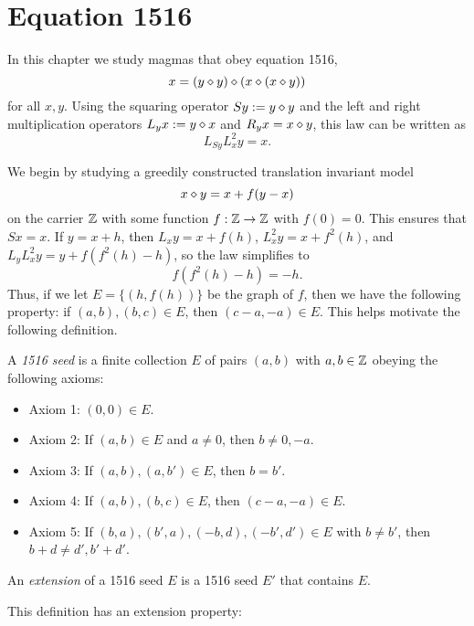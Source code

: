 \chapter{Equation 1516}\label{1516-chapter}

In this chapter we study magmas that obey equation 1516,
\begin{equation}\label{1516}
  x = (y \diamond y) \diamond (x \diamond (x \diamond y))
\end{equation}
for all $x,y$.  Using the squaring operator $Sy := y \diamond y$ and the left and right multiplication operators $L_y x := y \diamond x$ and $R_y x = x \diamond y$, this law can be written as
$$ L_{Sy} L_x^2 y = x.$$

We begin by studying a greedily constructed translation invariant model
\begin{equation}\label{xy-1516}
   x \diamond y = x+f(y-x)
\end{equation}
on the carrier $\mathbb{Z}$ with some function $f:\mathbb{Z} \to \mathbb{Z}$ with $f(0)=0$.  This ensures that $Sx = x$.  If $y = x+h$, then $L_x y = x + f(h)$, $L_x^2 y = x + f^2(h)$, and $L_y L_x^2 y = y + f(f^2(h)-h)$, so the law  simplifies to
\begin{equation}\label{1516-f}
   f(f^2(h)-h) = -h.
\end{equation}
Thus, if we let $E = \{ (h, f(h))\}$ be the graph of $f$, then we have the following property: if $(a,b), (b,c) \in E$, then $(c-a,-a) \in E$.  This helps motivate the following definition.

\begin{definition}[1516 seed]\label{1516-seed}  A \emph{1516 seed} is a finite collection $E$ of pairs $(a,b)$ with $a,b \in \mathbb{Z}$ obeying the following axioms:
  \begin{itemize}
  \item Axiom 1: $(0,0) \in E$.
  \item Axiom 2: If $(a,b) \in E$ and $a \neq 0$, then $b \neq 0, -a$.
  \item Axiom 3: If $(a,b), (a,b') \in E$, then $b=b'$.
  \item Axiom 4: If $(a,b), (b,c) \in E$, then $(c-a,-a) \in E$.
  \item Axiom 5: If $(b,a), (b',a), (-b, d), (-b',d') \in E$ with $b \neq b'$, then $b+d \neq d', b'+d'$.
  \end{itemize}
An \emph{extension} of a 1516 seed $E$ is a 1516 seed $E'$ that contains $E$.
\end{definition}

This definition has an extension property:

